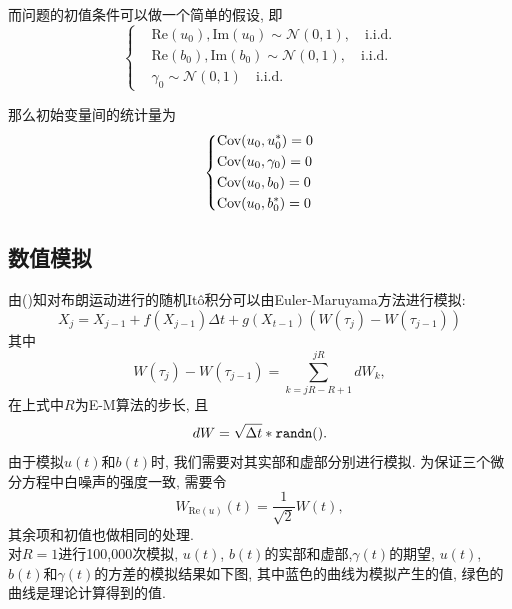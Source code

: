 \documentclass[notitlepage,cs4size,punct,oneside]{ctexrep}
\numberwithin{equation}{section}
\theoremstyle{mystyle}
\begin{document}
而问题的初值条件可以做一个简单的假设, 即
\begin{equation}
\left\{
\begin{aligned}
&\text{Re}(u_0), \text{Im}(u_0) \sim \mathcal{N}(0, 1), \quad \text{i.i.d.} \\
&\text{Re}(b_0), \text{Im}(b_0) \sim \mathcal{N}(0, 1), \quad \text{i.i.d.} \\
&\gamma_0 \sim \mathcal{N}(0, 1) \quad \text{i.i.d.}
\end{aligned}
\right.
\end{equation}

那么初始变量间的统计量为
\begin{equation}
\left\{
\begin{aligned}
&\text{Cov}(u_0, u_0^*) = 0 \\
&\text{Cov}(u_0, \gamma_0) = 0 \\
&\text{Cov}(u_0, b_0) = 0 \\
&\text{Cov}(u_0, b_0^*) = 0
\end{aligned}
\right.
\end{equation}

\subsection{数值模拟}
由(\cite{higham2001algorithmic})知对布朗运动进行的随机It\^o积分可以由Euler-Maruyama方法进行模拟\cite{higham2000mean}:
\begin{equation}
X_j = X_{j-1}+f(X_{j-1})\Delta t+g(X_{t-1})(W(\tau_j) - W(\tau_{j-1}))
\end{equation}
其中
$$
W(\tau_j) - W(\tau_{j-1}) = \sum_{k = jR-R+1}^{jR} dW_k,
$$
在上式中$R$为E-M算法的步长, 且
$$
dW = \sqrt{\Delta t}*\tt{randn()}.
$$
由于模拟$u(t)$和$b(t)$时, 我们需要对其实部和虚部分别进行模拟. 为保证三个微分方程中白噪声的强度一致, 需要令
$$W_{\text{Re}(u)}(t) = \frac{1}{\sqrt{2}}W(t),$$
其余项和初值也做相同的处理. \\

对$R=1$进行100,000次模拟\cite{robert2004monte}, $u(t)$, $b(t)$的实部和虚部,$\gamma(t)$的期望, $u(t)$, $b(t)$和$\gamma(t)$的方差的模拟结果如下图\cite{mckinney2012python}\cite{hunter2007matplotlib}, 其中蓝色的曲线为模拟产生的值, 绿色的曲线是理论计算得到的值. \\
\end{document}
